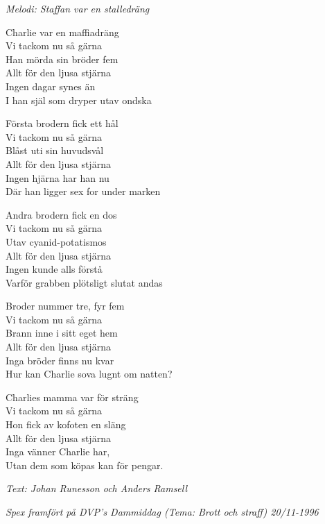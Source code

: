 {\footnotesize\textit{Melodi: Staffan var en stalledräng}}\par
\vspace{10pt}
Charlie var en maffiadräng\\
Vi tackom nu så gärna\\
Han mörda sin bröder fem\\
Allt för den ljusa stjärna\\
Ingen dagar synes än\\
I han själ som dryper utav ondska\par
\vspace{10pt}
Första brodern fick ett hål\\
Vi tackom nu så gärna\\
Blåst uti sin huvudsvål\\
Allt för den ljusa stjärna\\
Ingen hjärna har han nu\\
Där han ligger sex for under marken\par
\vspace{10pt}
Andra brodern fick en dos\\
Vi tackom nu så gärna\\
Utav cyanid-potatismos\\
Allt för den ljusa stjärna\\
Ingen kunde alls förstå\\
Varför grabben plötsligt slutat andas\par
\vspace{10pt}
Broder nummer tre, fyr fem\\
Vi tackom nu så gärna\\
Brann inne i sitt eget hem\\
Allt för den ljusa stjärna\\
Inga bröder finns nu kvar\\
Hur kan Charlie sova lugnt om natten?\par
\vspace{10pt}
Charlies mamma var för sträng\\
Vi tackom nu så gärna\\
Hon fick av kofoten en släng\\
Allt för den ljusa stjärna\\
Inga vänner Charlie har,\\
Utan dem som köpas kan för pengar.\par
\vspace{10pt}
{\footnotesize\textit{Text: Johan Runesson och Anders Ramsell}}\par
\vspace{10pt}
{\footnotesize\textit{Spex framfört på DVP's Dammiddag (Tema: Brott och straff) 20/11-1996}}\\

